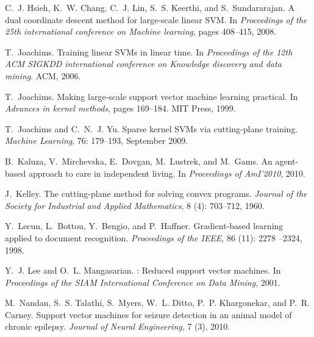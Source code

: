 \documentclass[twoside]{article}
\begin{document}
\begin{thebibliography}{45}
C.~J. Hsieh, K.~W. Chang, C.~J. Lin, S.~S. Keerthi, and S.~Sundararajan.
\newblock A dual coordinate descent method for large-scale linear {SVM}.
\newblock In \emph{Proceedings of the 25th international conference on Machine
  learning}, pages 408--415, 2008.

T.~Joachims.
\newblock Training linear {SVMs} in linear time.
\newblock In \emph{Proceedings of the 12th ACM SIGKDD international conference
  on Knowledge discovery and data mining}. ACM, 2006.

T.~Joachims.
\newblock Making large-scale support vector machine learning practical.
\newblock In \emph{Advances in kernel methods}, pages 169--184. MIT Press,
  1999.

T.~Joachims and C.~N.~J. Yu.
\newblock Sparse kernel {SVM}s via cutting-plane training.
\newblock \emph{Machine Learning}, 76: 179--193, September 2009.

B.~Kaluza, V.~Mirchevska, E.~Dovgan, M.~Lustrek, and M.~Gams.
\newblock An agent-based approach to care in independent living.
\newblock In \emph{Proceedings of AmI'2010}, 2010.

J.~Kelley.
\newblock The cutting-plane method for solving convex programs.
\newblock \emph{Journal of the Society for Industrial and Applied Mathematics},
  8 (4): 703--712, 1960.

Y.~Lecun, L.~Bottou, Y.~Bengio, and P.~Haffner.
\newblock Gradient-based learning applied to document recognition.
\newblock \emph{Proceedings of the IEEE}, 86 (11): 2278
  --2324, 1998.

Y.~J. Lee and O.~L. Mangasarian.
: {R}educed support vector machines.
\newblock In \emph{Proceedings of the SIAM International Conference on Data
  Mining}, 2001.

M.~Nandan, S.~S. Talathi, S.~Myers, W.~L. Ditto, P.~P. Khargonekar, and P.~R.
  Carney.
\newblock Support vector machines for seizure detection in an animal model of
  chronic epilepsy.
\newblock \emph{Journal of Neural Engineering}, 7 (3), 2010.


\end{thebibliography}
\end{document}
